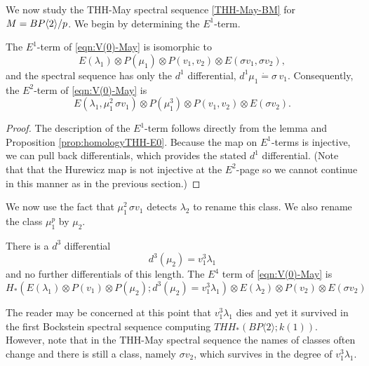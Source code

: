 We now study the THH-May spectral sequence \eqref{THH-May-BM} for $M=BP\langle 2 \rangle/p$. 
We begin by determining the $E^1$-term. 
\begin{prop}
	The $E^1$-term of \eqref{eqn:V(0)-May} is isomorphic to 
	\[
	E(\lambda_1)\otimes P(\mu_1)\otimes P(v_1,v_2)\otimes E(\sigma v_1, \sigma v_2),
	\]
	and the spectral sequence has only the $d^1$ differential, $d^1\mu_1 \dot{=} \sigma\, v_1$. Consequently, the $E^2$-term of \eqref{eqn:V(0)-May} is 
	\[ E(\lambda_1, \mu_1^2\, \sigma v_1)\otimes P(\mu_1^3)\otimes P(v_1,v_2)\otimes E(\sigma v_2). \]
\end{prop}
\begin{proof}
The description of the $E^1$-term follows directly from the lemma and Proposition \ref{prop:homologyTHH-E0}. 
Because the map on $E^1$-terms is injective, we can pull back differentials, which provides the stated $d^1$ differential. (Note that that the Hurewicz map is not injective at the $E^2$-page so we cannot continue in this manner as in the previous section.)
\end{proof}
We now use the fact that $\mu_1^2\, \sigma v_1$ detects $\lambda_2$ to rename this class. We also rename the class $\mu_1^p$ by $\mu_2$. 
\begin{prop}
	There is a $d^3$ differential 
	\[ d^3(\mu_2)=v_1^3\lambda_1 \]
	and no further differentials of this length. 
	The $E^{4}$ term of \eqref{eqn:V(0)-May} is 
	\[ H_*(E(\lambda_1)\otimes P(v_1)\otimes P(\mu_2 ); d^3(\mu_2)=v_1^3\lambda_1)\otimes E(\lambda_2)\otimes P(v_2)\otimes E(\sigma v_2) \]
\end{prop}
The reader may be concerned at this point that $v_1^3\lambda_1$ dies and yet it survived in the first Bockstein spectral sequence computing $THH_*(BP\langle 2\rangle ; k(1))$. However, note that in the THH-May spectral sequence the names of classes often change and there is still a class, namely $\sigma v_2$, which survives in the degree of $v_1^3\lambda_1$. 
